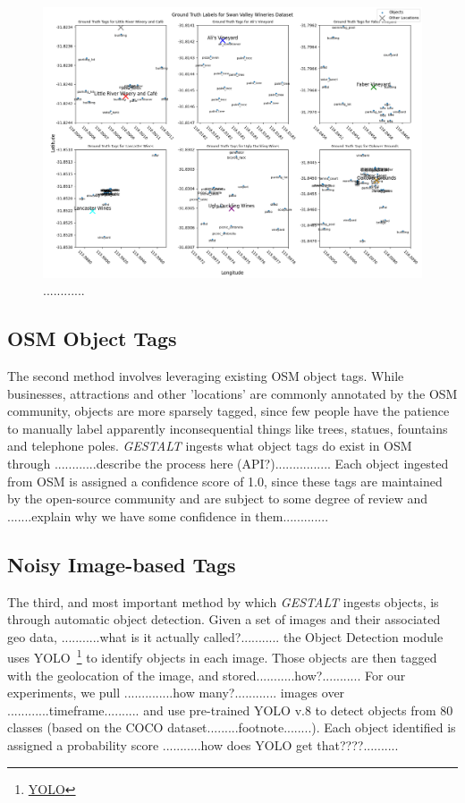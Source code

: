 \begin{figure}[ht]
\label{fig:loc-obj}        
\includegraphics[width=\textwidth]{papers/figures/loc_obj_labels_plot.png}
\centering
\caption[width=\textwidth]{............}
\end{figure}


\subsection{OSM Object Tags}
The second method involves leveraging existing OSM object tags.
While businesses, attractions and other 'locations' are commonly annotated by the OSM community, objects are more sparsely tagged, since few people have the patience to manually label apparently inconsequential things like trees, statues, fountains and telephone poles. 
\emph{GESTALT} ingests what object tags do exist in OSM through 
............describe the process here (API?)................
Each object ingested from OSM is assigned a confidence score of 1.0, since these tags are maintained by the open-source community and are subject to some degree of review and .......explain why we have some confidence in them.............


\subsection{Noisy Image-based Tags}
The third, and most important method by which \emph{GESTALT} ingests objects, is through automatic object detection.
Given a set of images and their associated geo data, ...........what is it actually called?........... the Object Detection module uses YOLO~\footnote{\href{https://github.com/ultralytics/ultralytics}{YOLO}} to identify objects in each image. Those objects are then tagged with the geolocation of the image, and stored...........how?........... For our experiments, we pull ..............how many?............ images over ............timeframe.......... and use pre-trained YOLO v.8 to detect objects from 80 classes (based on the COCO dataset.........footnote........). Each object identified is assigned a probability score ...........how does YOLO get that????..........



